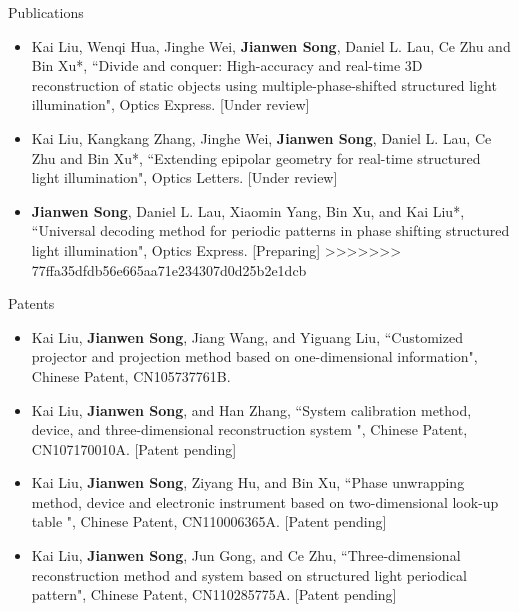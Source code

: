 \documentclass{resume} %
\begin{document}
\begin{rSection}{Publications}
\begin{itemize}[leftmargin=*]
\item Kai Liu, Wenqi Hua, Jinghe Wei, {\bf Jianwen Song}, Daniel L. Lau, Ce Zhu and Bin Xu*, ``Divide and conquer: High-accuracy and real-time 3D reconstruction of static objects using multiple-phase-shifted structured light illumination", Optics Express. [Under review]
\item Kai Liu, Kangkang Zhang, Jinghe Wei, {\bf Jianwen Song}, Daniel L. Lau, Ce Zhu and Bin Xu*, ``Extending epipolar geometry for real-time structured light illumination", Optics Letters. [Under review]
\item {\bf Jianwen Song}, Daniel L. Lau, Xiaomin Yang, Bin Xu, and Kai Liu*, ``Universal decoding method for periodic patterns in phase shifting structured light illumination", Optics Express. [Preparing]
>>>>>>> 77ffa35dfdb56e665aa71e234307d0d25b2e1dcb
\end{itemize}
\end{rSection}

\begin{rSection}{Patents}
\begin{itemize}[leftmargin=*]
	\item Kai Liu, {\bf Jianwen Song}, Jiang Wang, and Yiguang Liu, ``Customized projector and projection method based on one-dimensional information", Chinese Patent, CN105737761B.
	\item Kai Liu, {\bf Jianwen Song}, and Han Zhang, ``System calibration method, device, and three-dimensional reconstruction system ", Chinese Patent, CN107170010A. [Patent pending]
	\item Kai Liu, {\bf Jianwen Song}, Ziyang Hu, and Bin Xu, ``Phase unwrapping method, device and electronic instrument based on two-dimensional look-up table ", Chinese Patent, CN110006365A. [Patent pending]
	\item Kai Liu, {\bf Jianwen Song}, Jun Gong, and Ce Zhu, ``Three-dimensional reconstruction method and system based on structured light periodical pattern", Chinese Patent, CN110285775A. [Patent pending]
\end{itemize}
	
\end{rSection}

\end{document}
